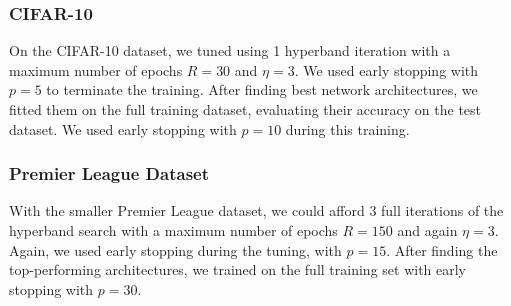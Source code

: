 
    \subsubsection{CIFAR-10}
        On the CIFAR-10 dataset, we tuned using 1 hyperband iteration with a maximum number of epochs $R=30$ and $\eta=3$. We used early stopping with $p=5$ to terminate the training. After finding best network architectures, we fitted them on the full training dataset, evaluating their accuracy on the test dataset. We used early stopping with $p=10$ during this training.

    \subsubsection{Premier League Dataset}
        With the smaller Premier League dataset, we could afford 3 full iterations of the hyperband search with a maximum number of epochs $R=150$ and again $\eta=3$. Again, we used early stopping during the tuning, with $p=15$. After finding the top-performing architectures, we trained on the full training set with early stopping with $p=30$.
